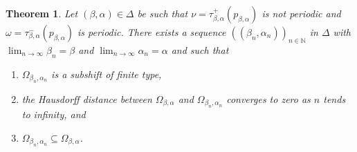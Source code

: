 \documentclass[a4paper,reqno,10pt]{amsart}
\newtheorem{theorem}{Theorem}[section]
\begin{document}
    \begin{theorem}\label{thm:one_perioidc}
        Let $(\beta,\alpha)\in\Delta$ be such that $\nu = \tau^{+}_{\beta, \alpha}(p_{\beta,\alpha})$ is not periodic and $\omega = \tau^{-}_{\beta, \alpha}(p_{\beta,\alpha})$ is periodic. There exists a sequence $((\beta_{n}, \alpha_{n}))_{n\in \mathbb{N}}$ in $\Delta$  with $\lim_{n\to \infty}\beta_{n} = \beta$ and $\lim_{n \to \infty}\alpha_{n} = \alpha$ and such that 
            \begin{enumerate}[label={\rm(\roman*)}]
                \item[\rm (1)] $\Omega_{\beta_{n},\alpha_n}$ is a subshift of finite type,
                \item[\rm (2)] the Hausdorff distance between $\Omega_{\beta, \alpha}$ and $\Omega_{\beta_{n}, \alpha_{n}}$ converges to zero as $n$ tends to infinity, and
                \item[\rm (3)] $\Omega_{\beta_{n},\alpha_n}\subseteq\Omega_{\beta,\alpha}$.
            \end{enumerate}
\end{theorem}
\end{document}
